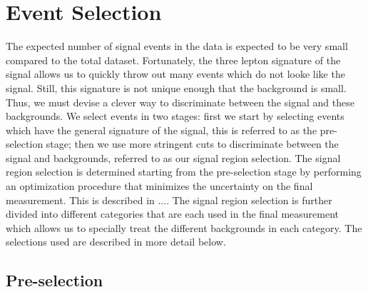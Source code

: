 \section{Event Selection}
\label{sec:event_selection}

The expected number of signal events in the data is expected
to be very small compared to the total dataset. %
Fortunately, the three lepton signature of the signal allows us to
quickly throw out many events which do not looke like the signal.
Still, this signature is not unique enough that the background
is small. Thus, we must devise a clever way to discriminate 
between the signal and these backgrounds. We select
events in two stages: first we start
by selecting events which have the general signature of the signal, 
this is referred to as the pre-selection stage; then we 
use more stringent cuts to discriminate between the signal and backgrounds, 
referred to as our signal region selection.
The signal region selection is determined starting from the pre-selection
stage by performing an optimization procedure that minimizes the uncertainty
on the final measurement.  This is described in \sec....
The signal region selection is further divided into different
categories that are each used in the final measurement
which allows us to specially treat the different backgrounds
in each category.  
The selections used are described in more detail below.




\subsection{Pre-selection}
\label{sec:preselection}


